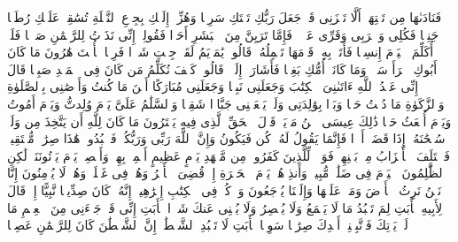 \stopbuffer
\startbuffer[\q:19:24]
فَنَادَىٰهَا مِن تَحۡتِهَاۤ أَلَّا تَحۡزَنِی قَدۡ جَعَلَ رَبُّكِ تَحۡتَكِ سَرِیࣰّا%
\stopbuffer
\startbuffer[\q:19:25]
وَهُزِّیۤ إِلَیۡكِ بِجِذۡعِ ٱلنَّخۡلَةِ تُسَٰقِطۡ عَلَیۡكِ رُطَبࣰا جَنِیࣰّا%
\stopbuffer
\startbuffer[\q:19:26]
فَكُلِی وَٱشۡرَبِی وَقَرِّی عَیۡنࣰاۖ فَإِمَّا تَرَیِنَّ مِنَ ٱلۡبَشَرِ أَحَدࣰا فَقُولِیۤ إِنِّی نَذَرۡتُ لِلرَّحۡمَٰنِ صَوۡمࣰا فَلَنۡ أُكَلِّمَ ٱلۡیَوۡمَ إِنسِیࣰّا%
\stopbuffer
\startbuffer[\q:19:27]
فَأَتَتۡ بِهِۦ قَوۡمَهَا تَحۡمِلُهُۥۖ قَالُوا۟ یَٰمَرۡیَمُ لَقَدۡ جِئۡتِ شَیۡءࣰا فَرِیࣰّا%
\stopbuffer
\startbuffer[\q:19:28]
یَٰۤأُخۡتَ هَٰرُونَ مَا كَانَ أَبُوكِ ٱمۡرَأَ سَوۡءࣲ وَمَا كَانَتۡ أُمُّكِ بَغِیࣰّا%
\stopbuffer
\startbuffer[\q:19:29]
فَأَشَارَتۡ إِلَیۡهِۖ قَالُوا۟ كَیۡفَ نُكَلِّمُ مَن كَانَ فِی ٱلۡمَهۡدِ صَبِیࣰّا%
\stopbuffer
\startbuffer[\q:19:30]
قَالَ إِنِّی عَبۡدُ ٱللَّهِ ءَاتَىٰنِیَ ٱلۡكِتَٰبَ وَجَعَلَنِی نَبِیࣰّا%
\stopbuffer
\startbuffer[\q:19:31]
وَجَعَلَنِی مُبَارَكًا أَیۡنَ مَا كُنتُ وَأَوۡصَٰنِی بِٱلصَّلَوٰةِ وَٱلزَّكَوٰةِ مَا دُمۡتُ حَیࣰّا%
\stopbuffer
\startbuffer[\q:19:32]
وَبَرَّۢا بِوَٰلِدَتِی وَلَمۡ یَجۡعَلۡنِی جَبَّارࣰا شَقِیࣰّا%
\stopbuffer
\startbuffer[\q:19:33]
وَٱلسَّلَٰمُ عَلَیَّ یَوۡمَ وُلِدتُّ وَیَوۡمَ أَمُوتُ وَیَوۡمَ أُبۡعَثُ حَیࣰّا%
\stopbuffer
\startbuffer[\q:19:34]
ذَٰلِكَ عِیسَى ٱبۡنُ مَرۡیَمَۖ قَوۡلَ ٱلۡحَقِّ ٱلَّذِی فِیهِ یَمۡتَرُونَ%
\stopbuffer
\startbuffer[\q:19:35]
مَا كَانَ لِلَّهِ أَن یَتَّخِذَ مِن وَلَدࣲۖ سُبۡحَٰنَهُۥۤۚ إِذَا قَضَىٰۤ أَمۡرࣰا فَإِنَّمَا یَقُولُ لَهُۥ كُن فَیَكُونُ%
\stopbuffer
\startbuffer[\q:19:36]
وَإِنَّ ٱللَّهَ رَبِّی وَرَبُّكُمۡ فَٱعۡبُدُوهُۚ هَٰذَا صِرَٰطࣱ مُّسۡتَقِیمࣱ%
\stopbuffer
\startbuffer[\q:19:37]
فَٱخۡتَلَفَ ٱلۡأَحۡزَابُ مِنۢ بَیۡنِهِمۡۖ فَوَیۡلࣱ لِّلَّذِینَ كَفَرُوا۟ مِن مَّشۡهَدِ یَوۡمٍ عَظِیمٍ%
\stopbuffer
\startbuffer[\q:19:38]
أَسۡمِعۡ بِهِمۡ وَأَبۡصِرۡ یَوۡمَ یَأۡتُونَنَاۖ لَٰكِنِ ٱلظَّٰلِمُونَ ٱلۡیَوۡمَ فِی ضَلَٰلࣲ مُّبِینࣲ%
\stopbuffer
\startbuffer[\q:19:39]
وَأَنذِرۡهُمۡ یَوۡمَ ٱلۡحَسۡرَةِ إِذۡ قُضِیَ ٱلۡأَمۡرُ وَهُمۡ فِی غَفۡلَةࣲ وَهُمۡ لَا یُؤۡمِنُونَ%
\stopbuffer
\startbuffer[\q:19:40]
إِنَّا نَحۡنُ نَرِثُ ٱلۡأَرۡضَ وَمَنۡ عَلَیۡهَا وَإِلَیۡنَا یُرۡجَعُونَ%
\stopbuffer
\startbuffer[\q:19:41]
وَٱذۡكُرۡ فِی ٱلۡكِتَٰبِ إِبۡرَٰهِیمَۚ إِنَّهُۥ كَانَ صِدِّیقࣰا نَّبِیًّا%
\stopbuffer
\startbuffer[\q:19:42]
إِذۡ قَالَ لِأَبِیهِ یَٰۤأَبَتِ لِمَ تَعۡبُدُ مَا لَا یَسۡمَعُ وَلَا یُبۡصِرُ وَلَا یُغۡنِی عَنكَ شَیۡءࣰا%
\stopbuffer
\startbuffer[\q:19:43]
یَٰۤأَبَتِ إِنِّی قَدۡ جَاۤءَنِی مِنَ ٱلۡعِلۡمِ مَا لَمۡ یَأۡتِكَ فَٱتَّبِعۡنِیۤ أَهۡدِكَ صِرَٰطࣰا سَوِیࣰّا%
\stopbuffer
\startbuffer[\q:19:44]
یَٰۤأَبَتِ لَا تَعۡبُدِ ٱلشَّیۡطَٰنَۖ إِنَّ ٱلشَّیۡطَٰنَ كَانَ لِلرَّحۡمَٰنِ عَصِیࣰّا%
